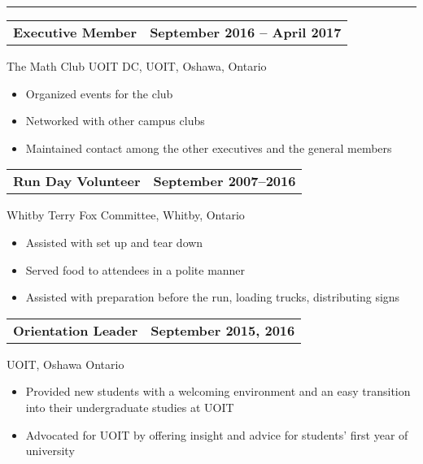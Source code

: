 \documentclass[]{article}
\begin{document}
\rule[1.2ex]{\linewidth}{0.4pt}
\begin{tabu}  to 
\textbf{Executive Member} & \textbf{September 2016 -- April 2017}\\
\end{tabu}
%
The Math Club UOIT DC, UOIT, Oshawa, Ontario
%
\begin{itemize}
\item
  Organized events for the club
\item
  Networked with other campus clubs
\item
  Maintained contact among the other executives and the general members
\end{itemize}
\begin{tabu}  to 
\textbf{Run Day Volunteer} & \textbf{September 2007--2016} \\
\end{tabu}
%
Whitby Terry Fox Committee, Whitby, Ontario
%
\begin{itemize}
\item
  Assisted with set up and tear down
\item
  Served food to attendees in a polite manner
\item
  Assisted with preparation before the run, loading trucks,
  distributing signs
\end{itemize}
\begin{tabu} to 
\textbf{Orientation Leader} & \textbf{September 2015, 2016} \\
\end{tabu}
%
UOIT, Oshawa Ontario
%
\begin{itemize}
\item
  Provided new students with a welcoming environment and an easy
  transition into their undergraduate studies at UOIT
\item
  Advocated for UOIT by offering insight and advice for students'
  first year of university
\end{itemize}
\end{document}
